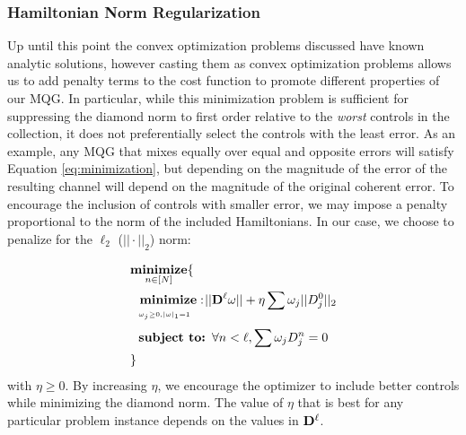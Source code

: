 \documentclass[aps,nofootinbib,pra,notitlepage,twocolumn]{revtex4-1}
\begin{document}


\subsubsection{Hamiltonian Norm Regularization}
\label{sec:norm}
Up until this point the convex optimization problems discussed have known analytic solutions, however casting them as convex optimization problems allows us to add penalty terms to the cost function to promote different properties of our MQG. In particular, while this minimization problem is sufficient for suppressing the diamond norm to first order relative to the \textit{worst} controls in the collection, it does not preferentially select the controls with the least error. As an example, any MQG that mixes equally over equal and opposite errors will satisfy Equation \ref{eq:minimization}, but depending on the magnitude of the error of the resulting channel will depend on the magnitude of the original coherent error. To encourage the inclusion of controls with smaller error, we may impose a penalty proportional to the norm of the included Hamiltonians. In our case, we choose to penalize for the $\ell_2$ ($||\cdot||_2$) norm:

\newcommand{\bunderbrace}[2]{%
  \begin{array}[t]{@{}c@{}}
  #1\\
  \parbox{\widthof{#1}}{$\scriptscriptstyle#2$}
  \end{array}
}

\begin{equation}\label{eq:minimization_l2}
\begin{split}
&\underset{n\in[N]}{\textbf{minimize}}\{\\
&\ \ \bunderbrace{\textbf{minimize}: }{\omega_j\geq0, |\omega|_1=1} ||{\bold{D}^{\ell}}\omega||+ \eta\sum\omega_j||D^0_j||_2\\
&\ \ \textbf{subject to: } \forall n<\ell, \sum \omega_jD_j^n=0\\
&\}
\end{split}
\end{equation}
with $\eta \geq 0$. By increasing $\eta$, we encourage the optimizer to include better controls while minimizing the diamond norm. The value of $\eta$ that is best for any particular problem instance depends on the values in $\bold{D}^\ell$.
\end{document}
